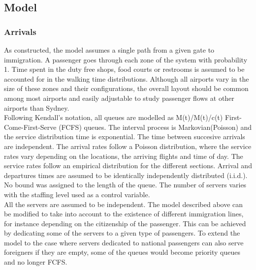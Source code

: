 \documentclass[11pt,onecolumn]{IEEEtran}
\begin{document}
\subsection{Model}
\subsubsection{Arrivals}




As constructed, the model assumes a single path from a given gate to immigration. A passenger goes through each zone of the system with probability 1. Time spent in the duty free shops, food courts or restrooms is assumed to be accounted for in the walking time distributions. Although all airports vary in the size of these zones and their configurations, the overall layout should be common among most airports and easily adjustable to study passenger flows at other airports than Sydney.\\

Following Kendall's notation\cite{Ross2010Introduction}, all queues are modelled as M(t)/M(t)/c(t) First-Come-First-Serve (FCFS) queues. The interval process is Markovian(Poisson) and the service distribution time is exponential. 
The time between succesive arrivals are independent.  
The arrival rates follow a Poisson distribution, where the service rates vary depending on the locations, the arriving flights and time of day.  The service rates follow an empirical distribution for the different sections. Arrival and departures times are assumed to be identically independently distributed (i.i.d.).
No bound was assigned to the length of the queue.
The number of servers varies with the staffing level used as a control variable.\\

All the servers are assumed to be independent. The model described above can be modified to take into account to the existence of  different immigration lines, for instance depending on the citizenship of the passenger. This can be achieved by dedicating some of the servers to a given type of passengers. To extend the model to the case where servers dedicated to national passengers can also serve foreigners if they are empty, some of the queues would become priority queues and no longer FCFS.
\end{document}
